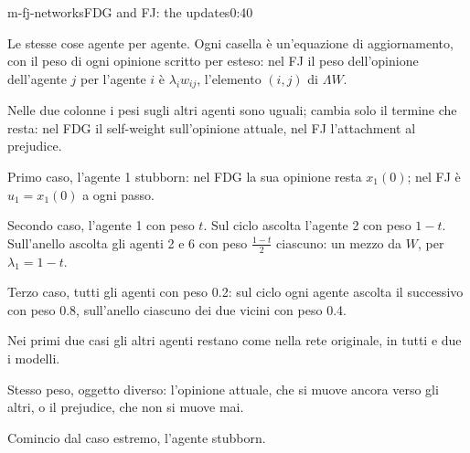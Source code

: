 \begin{slide}{m-fj-networks}{FDG and FJ: the updates}{0:40}
  \begin{discorso}
    \item Le stesse cose agente per agente. Ogni casella è un'equazione di aggiornamento, con il peso di ogni opinione scritto per esteso: nel FJ il peso dell'opinione dell'agente $j$ per l'agente $i$ è $\lambda_i w_{ij}$, l'elemento $(i,j)$ di $\Lambda W$.
    \item Nelle due colonne i pesi sugli altri agenti sono uguali; cambia solo il termine che resta: nel FDG il self-weight sull'opinione attuale, nel FJ l'attachment al prejudice.
    \item Primo caso, l'agente 1 stubborn: nel FDG la sua opinione resta $x_1(0)$; nel FJ è $u_1=x_1(0)$ a ogni passo.
    \item Secondo caso, l'agente 1 con peso $t$. Sul ciclo ascolta l'agente 2 con peso $1-t$. Sull'anello ascolta gli agenti 2 e 6 con peso $\frac{1-t}{2}$ ciascuno: un mezzo da $W$, per $\lambda_1=1-t$.
    \item Terzo caso, tutti gli agenti con peso 0.2: sul ciclo ogni agente ascolta il successivo con peso 0.8, sull'anello ciascuno dei due vicini con peso 0.4.
    \item Nei primi due casi gli altri agenti restano come nella rete originale, in tutti e due i modelli.
    \item Stesso peso, oggetto diverso: l'opinione attuale, che si muove ancora verso gli altri, o il prejudice, che non si muove mai.
    \item Comincio dal caso estremo, l'agente stubborn.
  \end{discorso}
\end{slide}

